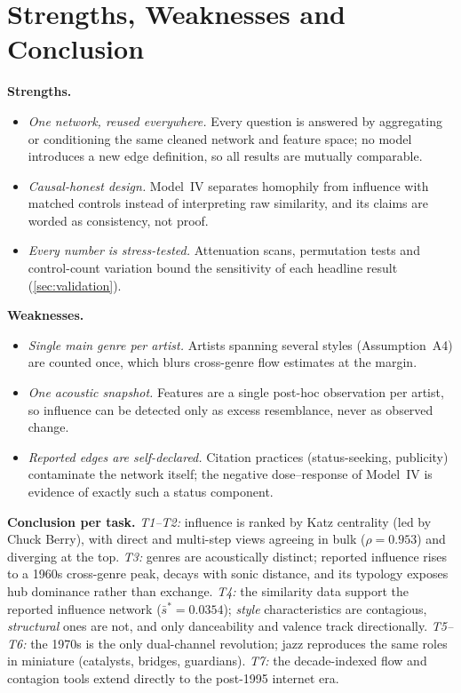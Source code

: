 \documentclass[11pt,letterpaper]{article}
\numberwithin{equation}{section}
\begin{document}
\section{Strengths, Weaknesses and Conclusion}\label{sec:conclusion}

\noindent\textbf{Strengths.}
\begin{itemize}[leftmargin=1.4em,itemsep=1pt]
  \item \emph{One network, reused everywhere.} Every question is answered
        by aggregating or conditioning the same cleaned network and feature
        space; no model introduces a new edge definition, so all results
        are mutually comparable.
  \item \emph{Causal-honest design.} Model~IV separates homophily from
        influence with matched controls instead of interpreting raw
        similarity, and its claims are worded as consistency, not proof.
  \item \emph{Every number is stress-tested.} Attenuation scans,
        permutation tests and control-count variation bound the
        sensitivity of each headline result (\cref{sec:validation}).
\end{itemize}

\noindent\textbf{Weaknesses.}
\begin{itemize}[leftmargin=1.4em,itemsep=1pt]
  \item \emph{Single main genre per artist.} Artists spanning several
        styles (Assumption~A4) are counted once, which blurs
        cross-genre flow estimates at the margin.
  \item \emph{One acoustic snapshot.} Features are a single post-hoc
        observation per artist, so influence can be detected only as
        excess resemblance, never as observed change.
  \item \emph{Reported edges are self-declared.} Citation practices
        (status-seeking, publicity) contaminate the network itself; the
        negative dose--response of Model~IV is evidence of exactly such a
        status component.
\end{itemize}

\noindent\textbf{Conclusion per task.}
\emph{T1--T2:} influence is ranked by Katz centrality (led by Chuck
Berry), with direct and multi-step views agreeing in bulk ($\rho=0.953$)
and diverging at the top. \emph{T3:} genres are acoustically distinct;
reported influence rises to a 1960s cross-genre peak, decays with sonic
distance, and its typology exposes hub dominance rather than exchange.
\emph{T4:} the similarity data support the reported influence network
($\bar s^{*}=0.0354$); \emph{style} characteristics are contagious,
\emph{structural} ones are not, and only danceability and valence track
directionally. \emph{T5--T6:} the 1970s is the only dual-channel
revolution; jazz reproduces the same roles in miniature (catalysts,
bridges, guardians). \emph{T7:} the decade-indexed flow and contagion
tools extend directly to the post-1995 internet era.
\end{document}
